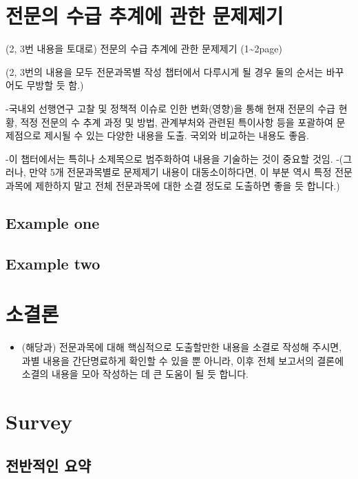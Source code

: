 \documentclass[]{book}
\providecommand{\tightlist}{%
  \setlength{\itemsep}{0pt}\setlength{\parskip}{0pt}}
\begin{document}
\hypertarget{section-10}{%
\chapter{전문의 수급 추계에 관한 문제제기}\label{section-10}}

(2, 3번 내용을 토대로) 전문의 수급 추계에 관한 문제제기 (1\textasciitilde2page)

(2, 3번의 내용을 모두 전문과목별 작성 챕터에서 다루시게 될 경우 둘의 순서는 바꾸어도 무방할 듯 함.)

-국내외 선행연구 고찰 및 정책적 이슈로 인한 변화(영향)을 통해 현재 전문의 수급 현황, 적정 전문의 수 추계 과정 및 방법, 관계부처와 관련된 특이사항 등을 포괄하여 문제점으로 제시될 수 있는 다양한 내용을 도출. 국외와 비교하는 내용도 좋음.

-이 챕터에서는 특히나 소제목으로 범주화하여 내용을 기술하는 것이 중요할 것임.
-(그러나, 만약 5개 전문과목별로 문제제기 내용이 대동소이하다면, 이 부분 역시 특정 전문과목에 제한하지 말고 전체 전문과목에 대한 소결 정도로 도출하면 좋을 듯 합니다.)

\hypertarget{example-one}{%
\section{Example one}\label{example-one}}

\hypertarget{example-two}{%
\section{Example two}\label{example-two}}

\hypertarget{section-11}{%
\chapter{소결론}\label{section-11}}

\begin{itemize}
\tightlist
\item
  (해당과) 전문과목에 대해 핵심적으로 도출할만한 내용을 소결로 작성해 주시면, 과별 내용을 간단명료하게 확인할 수 있을 뿐 아니라, 이후 전체 보고서의 결론에 소결의 내용을 모아 작성하는 데 큰 도움이 될 듯 합니다.
\end{itemize}

\hypertarget{survey}{%
\chapter{Survey}\label{survey}}

\hypertarget{section-12}{%
\section{전반적인 요약}\label{section-12}}
\end{document}
